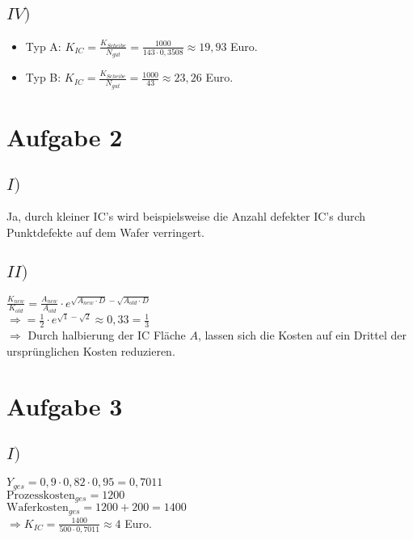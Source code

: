 \documentclass[a4paper]{scrartcl}
\begin{document}
\subsection*{$IV)$}
\begin{itemize}
	\item Typ A: $K_{IC} = \frac{K_{Scheibe}}{N_{gut}} = \frac{1000}{143 \cdot 0,3508} \approx 19,93$ Euro.
	\item Typ B: $K_{IC} = \frac{K_{Scheibe}}{N_{gut}} = \frac{1000}{43} \approx 23,26$ Euro.
\end{itemize}

\section*{Aufgabe 2}
\subsection*{$I)$}
Ja, durch kleiner IC's wird beispielsweise die Anzahl defekter IC's durch Punktdefekte auf dem Wafer verringert.

\subsection*{$II)$}
$\frac{K_{new}}{K_{old}} = \frac{A_{new}}{A_{old}} \cdot e^{\sqrt{A_{new} \cdot D} - \sqrt{A_{old} \cdot D}}$\\
$\Rightarrow = \frac{1}{2} \cdot e^{\sqrt{1} - \sqrt{2}} \approx 0,33 = \frac{1}{3}$\\
$\Rightarrow$ Durch halbierung der IC Fläche $A$, lassen sich die Kosten auf ein Drittel der ursprünglichen Kosten reduzieren.


\section*{Aufgabe 3}
\subsection*{$I)$}
$Y_{ges} = 0,9 \cdot 0,82 \cdot 0,95 = 0,7011$\\
$\text{Prozesskosten}_{ges} = 1200$\\
$\text{Waferkosten}_{ges} = 1200 + 200 = 1400$\\
$\Rightarrow K_{IC} = \frac{1400}{500 \cdot 0,7011} \approx 4$ Euro.
\end{document}
